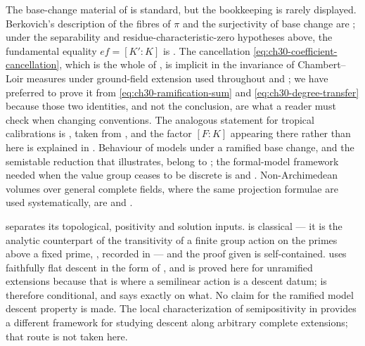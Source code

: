 The base-change material of  is standard, but the
bookkeeping is rarely displayed.  Berkovich's description of the fibres of
$\pi$ and the surjectivity of base change are \cite[\S1.4 and
\S3.4]{Berk12}; under the separability and residue-characteristic-zero
hypotheses above, the fundamental equality $ef=[K':K]$ is
\cite[Ch.~VI]{ZariskiSamuelII}.  The cancellation
\eqref{eq:ch30-coefficient-cancellation}, which is the whole of
, is implicit in the invariance of Chambert--Loir
measures under ground-field extension used throughout \cite{CL06} and
\cite{GM19}; we have preferred to prove it from
\eqref{eq:ch30-ramification-sum} and
\eqref{eq:ch30-degree-transfer} because those two identities, and not the
conclusion, are what a reader must check when changing conventions.  The
analogous statement for tropical calibrations is
, taken from
\cite[\S13--14]{CLD25}, and the factor $[F:K]$ appearing there rather than
here is explained in .  Behaviour of models under
a ramified base change, and the semistable reduction that
 illustrates, belong to
\cite{deJong1996}; the formal-model framework needed when the value group
ceases to be discrete is \cite{BoschLutkebohmert1993} and
\cite{RaynaudGruson1971}.  Non-Archimedean volumes over general complete
fields, where the same projection formulae are used systematically, are
\cite{BGM21} and \cite{BGGJKM20}.

 separates its topological, positivity and
solution inputs.
 is classical --- it is the analytic
counterpart of the transitivity of a finite group action on the primes above
a fixed prime, \cite[Tag 0BRI]{stacks-project}, recorded in
 --- and the proof given is self-contained.
 uses faithfully flat descent in the form of
\cite[Exp.~VIII, Theorem~1.1, Corollary~5.8 and
Proposition~7.8]{SGA1}, and is proved here for unramified extensions
because that is where a semilinear action is a descent datum;
 is therefore conditional, and
 says exactly on what.  No claim for the
ramified model descent property is made.  The local characterization of
semipositivity in \cite{GM19} provides a different framework for studying
descent along arbitrary complete extensions; that route is not taken here.

